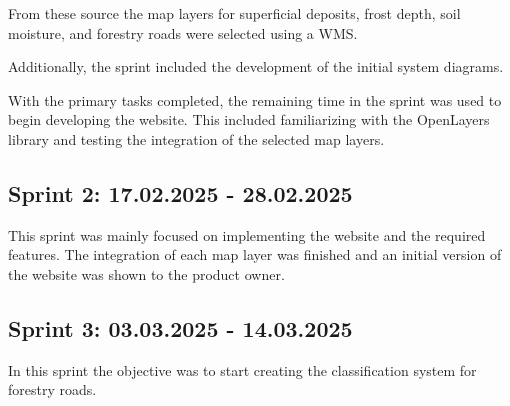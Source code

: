 From these source the map layers for superficial deposits, frost depth, soil moisture, and forestry roads were selected using a WMS.

Additionally, the sprint included the development of the initial system diagrams. 

With the primary tasks completed, the remaining time in the sprint was used to begin developing the website. This included familiarizing with the OpenLayers library and testing the integration of the selected map layers.

\subsection{Sprint 2: 17.02.2025 - 28.02.2025}

This sprint was mainly focused on implementing the website and the required features. The integration of each map layer was finished and an initial version of the website was shown to the product owner.  

\subsection{Sprint 3: 03.03.2025 - 14.03.2025}

In this sprint the objective was to start creating the classification system for forestry roads. 

